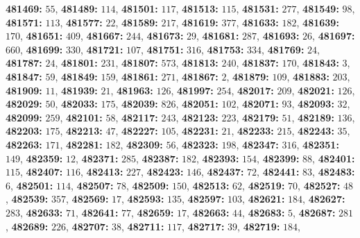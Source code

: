 \textsf{\bfseries 481469:} $55$, \textsf{\bfseries 481489:} $114$, \textsf{\bfseries 481501:} $117$, \textsf{\bfseries 481513:} $115$, \textsf{\bfseries 481531:} $277$, \textsf{\bfseries 481549:} $98$, \textsf{\bfseries 481571:} $113$, \textsf{\bfseries 481577:} $22$, \textsf{\bfseries 481589:} $217$, \textsf{\bfseries 481619:} $377$, \textsf{\bfseries 481633:} $182$, \textsf{\bfseries 481639:} $170$, \textsf{\bfseries 481651:} $409$, \textsf{\bfseries 481667:} $244$, \textsf{\bfseries 481673:} $29$, \textsf{\bfseries 481681:} $287$, \textsf{\bfseries 481693:} $26$, \textsf{\bfseries 481697:} $660$, \textsf{\bfseries 481699:} $330$, \textsf{\bfseries 481721:} $107$, \textsf{\bfseries 481751:} $316$, \textsf{\bfseries 481753:} $334$, \textsf{\bfseries 481769:} $24$, \textsf{\bfseries 481787:} $24$, \textsf{\bfseries 481801:} $231$, \textsf{\bfseries 481807:} $573$, \textsf{\bfseries 481813:} $240$, \textsf{\bfseries 481837:} $170$, \textsf{\bfseries 481843:} $3$, \textsf{\bfseries 481847:} $59$, \textsf{\bfseries 481849:} $159$, \textsf{\bfseries 481861:} $271$, \textsf{\bfseries 481867:} $2$, \textsf{\bfseries 481879:} $109$, \textsf{\bfseries 481883:} $203$, \textsf{\bfseries 481909:} $11$, \textsf{\bfseries 481939:} $21$, \textsf{\bfseries 481963:} $126$, \textsf{\bfseries 481997:} $254$, \textsf{\bfseries 482017:} $209$, \textsf{\bfseries 482021:} $126$, \textsf{\bfseries 482029:} $50$, \textsf{\bfseries 482033:} $175$, \textsf{\bfseries 482039:} $826$, \textsf{\bfseries 482051:} $102$, \textsf{\bfseries 482071:} $93$, \textsf{\bfseries 482093:} $32$, \textsf{\bfseries 482099:} $259$, \textsf{\bfseries 482101:} $58$, \textsf{\bfseries 482117:} $243$, \textsf{\bfseries 482123:} $223$, \textsf{\bfseries 482179:} $51$, \textsf{\bfseries 482189:} $136$, \textsf{\bfseries 482203:} $175$, \textsf{\bfseries 482213:} $47$, \textsf{\bfseries 482227:} $105$, \textsf{\bfseries 482231:} $21$, \textsf{\bfseries 482233:} $215$, \textsf{\bfseries 482243:} $35$, \textsf{\bfseries 482263:} $171$, \textsf{\bfseries 482281:} $182$, \textsf{\bfseries 482309:} $56$, \textsf{\bfseries 482323:} $198$, \textsf{\bfseries 482347:} $316$, \textsf{\bfseries 482351:} $149$, \textsf{\bfseries 482359:} $12$, \textsf{\bfseries 482371:} $285$, \textsf{\bfseries 482387:} $182$, \textsf{\bfseries 482393:} $154$, \textsf{\bfseries 482399:} $88$, \textsf{\bfseries 482401:} $115$, \textsf{\bfseries 482407:} $116$, \textsf{\bfseries 482413:} $227$, \textsf{\bfseries 482423:} $146$, \textsf{\bfseries 482437:} $72$, \textsf{\bfseries 482441:} $83$, \textsf{\bfseries 482483:} $6$, \textsf{\bfseries 482501:} $114$, \textsf{\bfseries 482507:} $78$, \textsf{\bfseries 482509:} $150$, \textsf{\bfseries 482513:} $62$, \textsf{\bfseries 482519:} $70$, \textsf{\bfseries 482527:} $48$, \textsf{\bfseries 482539:} $357$, \textsf{\bfseries 482569:} $17$, \textsf{\bfseries 482593:} $135$, \textsf{\bfseries 482597:} $103$, \textsf{\bfseries 482621:} $184$, \textsf{\bfseries 482627:} $283$, \textsf{\bfseries 482633:} $71$, \textsf{\bfseries 482641:} $77$, \textsf{\bfseries 482659:} $17$, \textsf{\bfseries 482663:} $44$, \textsf{\bfseries 482683:} $5$, \textsf{\bfseries 482687:} $281$, \textsf{\bfseries 482689:} $226$, \textsf{\bfseries 482707:} $38$, \textsf{\bfseries 482711:} $117$, \textsf{\bfseries 482717:} $39$, \textsf{\bfseries 482719:} $184$, 
